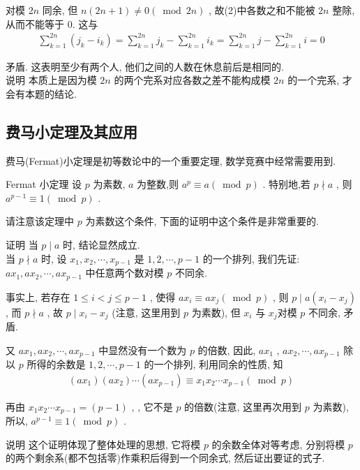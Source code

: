 	对模 $2 n$ 同余, 但 $n(2 n+1) \neq 0(\bmod 2 n)$ , 故(2)中各数之和不能被 $2 n$ 整除, 从而不能等于 0. 这与
	\begin{align*}
		\sum_{k=1}^{2 n}\left(j_{k}-i_{k}\right)=\sum_{k=1}^{2 n} j_{k}-\sum_{k=1}^{2 n} i_{k}=\sum_{k=1}^{2 n} j-\sum_{k=1}^{2 n} i=0
	\end{align*}

	矛盾. 这表明至少有两个人, 他们之间的人数在休息前后是相同的.\\
	说明 本质上是因为模 $2 n$ 的两个完系对应各数之差不能构成模 $2 n$ 的一个完系, 才会有本题的结论.

	\subsection{费马小定理及其应用}
	费马(Fermat)小定理是初等数论中的一个重要定理, 数学竞赛中经常需要用到.

	Fermat 小定理 设 $p$ 为素数, $a$ 为整数,则 $a^{p} \equiv a(\bmod p)$ . 特别地,若 $p \nmid a$ , 则 $a^{p-1} \equiv 1(\bmod p)$ .

	请注意该定理中 $p$ 为素数这个条件, 下面的证明中这个条件是非常重要的.

	证明 当 $p \mid a$ 时, 结论显然成立. \\
	当 $p \nmid a$ 时, 设 $x_{1}, x_{2}, \cdots, x_{p-1}$ 是 $1,2, \cdots, p-1$ 的一个排列, 我们先证:  $a x_{1}, a x_{2}, \cdots, a x_{p-1}$ 中任意两个数对模 $p$ 不同余.

	事实上, 若存在 $1 \leqslant i<j \leqslant p-1$ , 使得 $a x_{i} \equiv a x_{j}(\bmod p)$ , 则 $p \mid a\left(x_{i}-x_{j}\right)$ , 而 $p \nmid a$ , 故 $p \mid x_{i}-x_{j}$ (注意, 这里用到 $p$ 为素数), 但 $x_{i}$ 与 $x_{j}$对模 $p$ 不同余, 矛盾.

	又 $a x_{1}, a x_{2}, \cdots, a x_{p-1}$ 中显然没有一个数为 $p$ 的倍数, 因此,  $a x_{1}$ ,  $a x_{2}, \cdots, a x_{p-1}$ 除以 $p$ 所得的余数是 $1,2, \cdots, p-1$ 的一个排列, 利用同余的性质, 知
	\begin{align*}
		\left(a x_{1}\right)\left(a x_{2}\right) \cdots\left(a x_{p-1}\right) \equiv x_{1} x_{2} \cdots x_{p-1}(\bmod p)
	\end{align*}

	再由 $x_{1} x_{2} \cdots x_{p-1}=(p-1)$ , , 它不是 $p$ 的倍数(注意, 这里再次用到 $p$ 为素数), 所以,  $a^{p-1} \equiv 1(\bmod p)$ .

	说明 这个证明体现了整体处理的思想, 它将模 $p$ 的余数全体对等考虑, 分别将模 $p$ 的两个剩余系(都不包括零)作乘积后得到一个同余式, 然后证出要证的式子.

